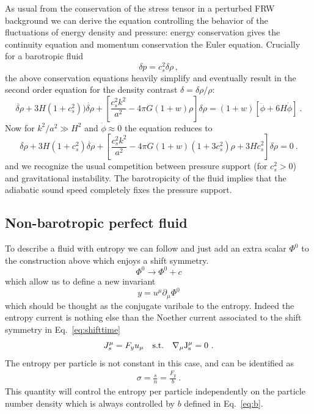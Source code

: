 As usual from the conservation of the stress tensor in a perturbed FRW background we can derive the equation controlling the behavior of the fluctuations of energy density and pressure: energy conservation gives the continuity equation and momentum conservation the Euler equation. Crucially for a barotropic fluid 
\begin{equation}
\delta p=c_s^2\delta\rho\,,
\end{equation}
the above conservation equations heavily simplify and eventually result in the second order equation for the density contrast $\delta=\delta\rho/\rho$:
\begin{equation}
\ddot{\delta\rho}+3H(1+c_s^2))\dot{\delta\rho}+\left[\frac{c_s^2k^2}{a^2}-4\pi G(1+w)\rho\right]\delta\rho=(1+w)\left[\ddot{\phi}+6H\dot{\phi}\right]\ .
\end{equation}
Now for $k^2/a^2\gg H^2$ and $\dot{\phi}\approx 0$ the equation reduces to 
\begin{equation}
\ddot{\delta\rho}+3H(1+c_s^2)\dot{\delta\rho}+\left[\frac{c_s^2k^2}{a^2}-4\pi G(1+w)(1+3c_s^2)\rho+3H\dot c_s^2\right]\delta\rho=0\ .
\end{equation}
and we recognize the usual competition between pressure support (for $c_s^2>0$) and gravitational instability. The barotropicity of the fluid implies that the adiabatic sound speed completely fixes the pressure support. 

\subsection{Non-barotropic perfect fluid}
To describe a fluid with entropy we can follow \cite{Dubovsky:2011sj,Ballesteros:2016kdx} and just add an extra scalar $\Phi^0$ to the construction above which enjoys a shift symmetry. 
\begin{equation}
\Phi^0\to\Phi^0+c\label{eq:shifttime}
\end{equation}
which allow us to define a new invariant 
\begin{equation}
y=u^\mu\partial_\mu\Phi^0
\end{equation}
which should be thought as the conjugate varibale to the entropy. Indeed the entropy current is nothing else than the Noether current associated to the shift symmetry in Eq.~\eqref{eq:shifttime}
\begin{equation}
J_s^{\mu}=F_y u_\mu\quad \rm{s.t.}\quad \nabla_\mu J^\mu_s=0\ .
\end{equation}
The entropy per particle is not constant in this case, and can be identified as
\begin{align}
    \sigma=\frac{s}{n}=\frac{F_y}{b}\ .
\end{align}
This quantity will control the entropy per particle independently on the particle number density which is always controlled by $b$ defined in Eq.~\eqref{eq:b}.

